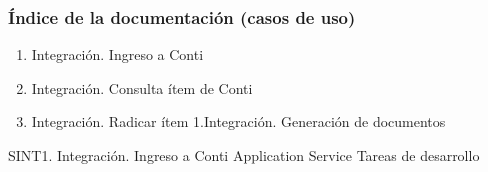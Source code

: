 \documentclass[
  paper=a4,
  ,captions=tableheading
]{scrartcl}
\providecommand{\tightlist}{%
  \setlength{\itemsep}{0pt}\setlength{\parskip}{0pt}}
\begin{document}
\subsubsection{Índice de la documentación (casos de
uso)}\label{sec:uxedndice-de-la-documentaciuxf3n-casos-de-uso-4}

\begin{enumerate}
\def\labelenumi{\arabic{enumi}.}
\tightlist
\item
  Integración. Ingreso a Conti
\item
  Integración. Consulta ítem de Conti
\item
  Integración. Radicar ítem 1.Integración. Generación de documentos
\end{enumerate}

\textbar{} \textbar{} SINT1. Integración. Ingreso a Conti \textbar{}
Application Service \textbar{} Tareas de desarrollo
\end{document}

